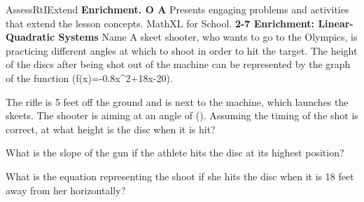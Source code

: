 \documentclass{article}
\newenvironment{te-addendum}[2]{}{}     %
\newcommand{\answer}[1]{}               %
\newcommand{\placeholder}[2]{}          %
\newcommand{\te}[1]{}                   %
\begin{document}
\begin{te-addendum}{Assess}{RtIExtend}
\textbf{Enrichment. O A}
Presents engaging problems and activities that extend the lesson concepts.
MathXL for School.
\textbf{2-7 Enrichment: Linear-Quadratic Systems}
Name \underline{\hspace{3cm}}
A skeet shooter, who wants to go to the Olympics, is practicing different angles at which to shoot in order to hit the target. The height of the discs after being shot out of the machine can be represented by the graph of the function (f(x)=-0.8x^2+18x-20).
\placeholder{graph}{Enrichment: first-quadrant graph of downward parabola f(x)=-0.8x^2+18x-20. Axes x,y; x labels 0,5,10,15,20, grid spacing 2.5; y labels 0,20,40,60,80, grid spacing 10. Window x=0 to 22.5,y=0 to 90. Curve crosses y=0 at approximately x=1.17 and 21.33, with vertex approximately (11.25,81.25).}
The rifle is 5 feet off the ground and is next to the machine, which launches the skeets. The shooter is aiming at an angle of ().
Assuming the timing of the shot is correct, at what height is the disc when it is hit?
\answer{20 ft}
What is the slope of the gun if the athlete hits the disc at its highest position?
\answer{(81.25=m(11.25)+5)
(81.25=11.25m+5)
(11.25m=76.25)
(m=6.78)}
What is the equation representing the shoot if she hits the disc when it is 18 feet away from her horizontally?
\answer{(y=-0.8(18)^2+18(18)-20)
(=-0.8(324)+324-20)
(=-259.2+324-20)
(=44.8\text{ ft})
(44.8=m(18)+5)
(44.8=18m+5)
(18m=39.8)
(m\approx2.2)
(y\approx2.2m+5)}
\te{Printed ``angle of 3/4'' without an angle unit; likely slope 3/4. Printed ``shoot'' and final equation y approximately 2.2m+5; likely ``shot'' and y approximately 2.2x+5. enVision Algebra 2, Teaching Resources; SavvasRealize.com.}
\end{te-addendum}
\end{document}
